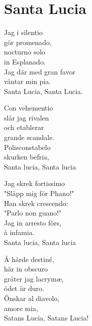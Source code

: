 \section{Santa Lucia}
Jag i silentio\\
gör promenado,\\
nocturno solo\\
in Esplanado.\\
Jag där med gran favor\\
väntar min pia.\\
Santa Lucia, Santa Lucia.

Con vehementio\\
slår jag rivalen\\
och etablerar\\
grande scandale.\\
Polisconstabelo\\
skurken befria,\\
Santa lucia, Santa lucia

Jag skrek fortissimo\\
"Släpp mig för Phano!"\\
Han skrek crescendo:\\
"Parlo non guano!"\\
Jag in arresto förs,\\
å infamia.\\
Santa lucia, Santa lucia

Å hårde destiné,\\
här in obscuro\\
gråter jag lacrymæ,\\
ödet är duro.\\
Önskar al diavolo,\\
amore mia,\\
Satans Lucia, Satans Lucia!